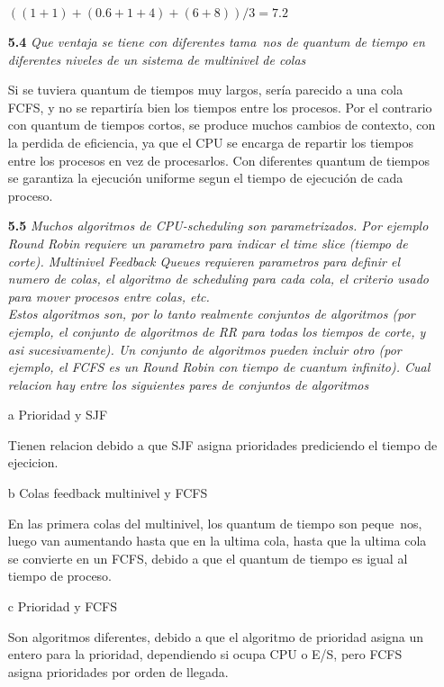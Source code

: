 \begin{itemize}
$((1+1) + (0.6 + 1 + 4) + (6 + 8))/ 3 = 7.2$

\item[\textbf{5.4}]\emph{Que ventaja se tiene con diferentes tama~nos de quantum de tiempo en diferentes niveles de un sistema de multinivel de colas}

Si se tuviera quantum de tiempos muy largos, ser\'ia parecido a una cola FCFS, y no se repartir\'ia bien los tiempos entre los procesos. Por el contrario con quantum de tiempos cortos, se produce muchos cambios de contexto, con la perdida de eficiencia, ya que el CPU se encarga de repartir los tiempos entre los procesos en vez de procesarlos. Con diferentes quantum de tiempos se garantiza la ejecuci\'on uniforme segun el tiempo de ejecuci\'on de cada proceso.

\item[\textbf{5.5}]\emph{Muchos algoritmos de CPU-scheduling son parametrizados. Por ejemplo Round Robin requiere un parametro para indicar el time slice (tiempo de corte). Multinivel Feedback Queues requieren parametros para definir el numero de colas, el algoritmo de scheduling para cada cola, el criterio usado para mover procesos entre colas, etc.\\
Estos algoritmos son, por lo tanto realmente conjuntos de algoritmos (por ejemplo, el conjunto de algoritmos de RR para todas los tiempos de corte, y asi sucesivamente). Un conjunto de algoritmos pueden incluir otro (por ejemplo, el FCFS es un Round Robin con tiempo de cuantum infinito). Cual relacion hay entre los siguientes pares de conjuntos de algoritmos}

\item[a] Prioridad y SJF

Tienen relacion debido a que SJF asigna prioridades prediciendo el tiempo de ejecicion.

\item[b] Colas feedback multinivel y FCFS

En las primera colas del multinivel, los quantum de tiempo son peque~nos, luego van aumentando hasta que en la ultima cola, hasta que la ultima cola se convierte en un FCFS, debido a que el quantum de tiempo es igual al tiempo de proceso.

\item[c] Prioridad y FCFS

Son algoritmos diferentes, debido a que el algoritmo de prioridad asigna un entero para la prioridad, dependiendo si ocupa CPU o E/S, pero FCFS asigna prioridades por orden de llegada.
 

\end{itemize}
